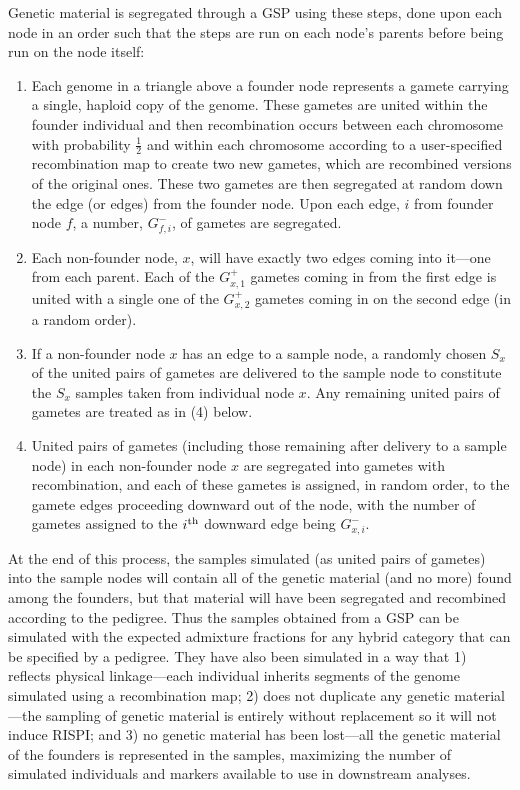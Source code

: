 Genetic material is segregated through
a GSP using these steps, done upon each node in an order such that the steps
are run on each node's parents before being run on the node itself:
\begin{enumerate}
\item Each genome in a triangle above a founder node represents a gamete
carrying a single, haploid copy of the genome.
These gametes are united within the founder individual and then
recombination occurs between each chromosome
with probability $\frac{1}{2}$ and within each chromosome according to
a user-specified recombination map to create two new gametes, which are
recombined versions of the original ones.  These two gametes are then segregated at random down the edge (or edges) from the founder node. Upon each edge, $i$ from founder node $f$,  a number, $G^-_{f,i}$, of gametes are segregated. 
\item Each non-founder node, $x$, will have exactly two edges coming
into it---one from each parent.  Each of the $G^+_{x,1}$ gametes coming in from the
first edge is united with a single one of the $G^+_{x,2}$ gametes coming
in on the second edge (in a random order).
\item If a non-founder node $x$ has an edge to a sample node,
a randomly chosen $S_x$ of the united pairs of gametes are delivered
to the sample node to constitute the $S_x$ samples taken from individual
node $x$. Any remaining united pairs of gametes are treated as in (4) below.
\item United pairs of gametes (including those remaining after delivery
to a sample node) in each non-founder node $x$ are segregated into
gametes with recombination, and each of these gametes is assigned, in
random order, to the gamete edges proceeding downward out of the node,
with the number of gametes assigned to the $i^\mathrm{th}$ downward edge being
$G^-_{x,i}$.
\end{enumerate}
At the end of this process, the samples simulated (as united pairs of gametes)
into the sample nodes will contain all of the genetic material (and no more) found among the founders, but that
material will have been segregated and recombined according to the pedigree.  Thus the
samples obtained from a GSP can be simulated with the expected admixture fractions
for any hybrid category that can be specified by a pedigree.  They have also been simulated
in a way that 1) reflects physical linkage---each individual inherits segments of the genome
simulated using a recombination map; 2) does not duplicate any genetic material---the sampling of
genetic material is entirely without replacement so it will not induce RISPI; and 3) no genetic material has been lost---all the genetic material of the founders
is represented in the samples, maximizing the number of simulated individuals and markers available to
use in downstream analyses.

